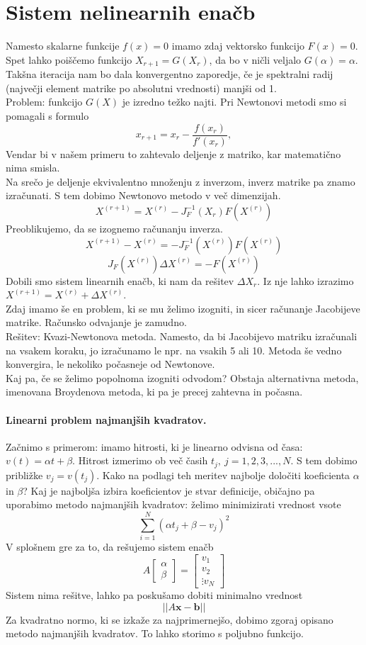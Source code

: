 \documentclass[a4paper]{article}
\begin{document}
\section{Sistem nelinearnih enačb}
Namesto skalarne funkcije $f(x) = 0$ imamo zdaj vektorsko funkcijo $F(x) = 0$.
Spet lahko poiščemo funkcijo $X_{r+1}=G(X_r)$, da bo v ničli veljalo $G(\alpha) = \alpha$.
Takšna iteracija nam bo dala konvergentno zaporedje, če je spektralni radij (največji element matrike po absolutni vrednosti) manjši od 1. \\
Problem: funkcijo $G(X)$ je izredno težko najti. Pri Newtonovi metodi smo si pomagali s formulo $$x_{r+1} = x_r - \frac{f(x_r)}{f'(x_r)},$$
Vendar bi v našem primeru to zahtevalo deljenje z matriko, kar matematično nima smisla. \\
Na srečo je deljenje ekvivalentno množenju z inverzom, inverz matrike pa znamo izračunati. S tem dobimo Newtonovo metodo v več dimenzijah.
$$X^{(r+1)} = X^{(r)} - J_F^{-1}(X_r)F(X^{(r)})$$
Preoblikujemo, da se izognemo računanju inverza.
$$X^{(r+1)} - X^{(r)} = -J_F^{-1}(X^{(r)})F(X^{(r)})$$
$$J_F(X^{(r)})\Delta X^{(r)} = -F(X^{(r)})$$
Dobili smo sistem linearnih enačb, ki nam da rešitev $\Delta X_r$. Iz nje lahko izrazimo $X^{(r+1)} = X^{(r)} + \Delta X^{(r)}$. \\[4mm]
Zdaj imamo še en problem, ki se mu želimo izogniti, in sicer računanje Jacobijeve matrike. Računsko odvajanje je zamudno. \\
Rešitev: Kvazi-Newtonova metoda. Namesto, da bi Jacobijevo matriku izračunali na vsakem koraku, jo izračunamo le npr. na vsakih 5 ali 10.
Metoda še vedno konvergira, le nekoliko počasneje od Newtonove. \\
Kaj pa, če se želimo popolnoma izogniti odvodom? Obstaja alternativna metoda, imenovana Broydenova metoda, ki pa je precej zahtevna in počasna.
\paragraph{Linearni problem najmanjših kvadratov.} Začnimo s primerom: imamo hitrosti, ki je linearno odvisna od časa: \(v(t) = \alpha t + \beta\). Hitrost izmerimo ob več časih \(t_j,~j=1, 2, 3, ..., N\).
S tem dobimo približke \(v_j = v(t_j)\). Kako na podlagi teh meritev najbolje določiti koeficienta \(\alpha\) in \(\beta\)?
Kaj je najboljša izbira koeficientov je stvar definicije, običajno pa uporabimo metodo najmanjših kvadratov: želimo minimizirati vrednost vsote \[\sum_{i=1}^N (\alpha t_j + \beta - v_j)^2\]
V splošnem gre za to, da rešujemo sistem enačb \[A \begin{bmatrix}
    \alpha \\ \beta
\end{bmatrix} = \begin{bmatrix}
    v_1 \\ v_2 \\ \vdots v_N
\end{bmatrix}\]
Sistem nima rešitve, lahko pa poskušamo dobiti minimalno vrednost \[||A\mathbf{x} - \mathbf{b}||\]
Za kvadratno normo, ki se izkaže za najprimernejšo, dobimo zgoraj opisano metodo najmanjših kvadratov. To lahko storimo s poljubno funkcijo.
\end{document}
